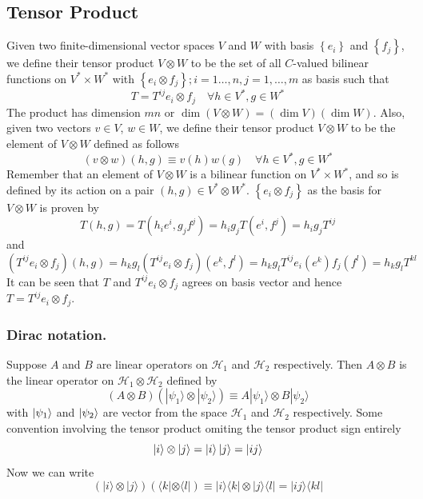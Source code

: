 \documentclass[../../../main.tex]{subfiles}
\begin{document}
\subsection{Tensor Product}
Given two finite-dimensional vector spaces $V$ and $W$ with basis $\left\{ e_i \right\} $ and $\left\{ f_j \right\} $, we define their tensor product $V \otimes W$ to be the set of all $C$-valued bilinear functions on $V ^* \times W ^*$ with $\left\{ e_i \otimes f_j \right\}; i=1\dots,n,j=1,\dots ,m $ as basis such that
\begin{equation*}
  T=T^{ij} e_i \otimes f_j \quad \forall h \in V^*, g \in W^*
\end{equation*}
The product has dimension $mn$ or $\dim(V \otimes W) = (\dim V)(\dim W)$.
Also, given two vectors $v \in V $, $w \in W$, we define their tensor product $V \otimes W$ to be the element of $V \otimes W$ defined as follows
\begin{equation*}
  (v \otimes w)(h, g) \equiv v(h)w(g) \quad \forall h \in V^*, g \in W^*
\end{equation*}
Remember that an element of $V \otimes W$ is a bilinear function on $V ^* \times  W ^*$, and so is defined by its action on a pair $(h, g) \in V ^* \otimes W ^*$.
$\left\{ e_i \otimes f_j \right\}$ as the basis for $V \otimes W$ is proven by
\begin{equation*}
  T(h, g) =  T(h_i e^i,g_j f^j) = h_i g_j T(e^i, f^j) = h_i g_j T^{ij}
\end{equation*}
and
\begin{equation*}
  (T^{ij} e_i \otimes f_j)(h, g)
  = h_kg_l(T^{ij} e_i \otimes f_j) (e^k, f^l)
  = h_kg_lT^{ij} e_i (e^k) f_j (f^l)
  = h_kg_lT^{kl}
\end{equation*}
It can be seen that $T$ and $T^{ij} e_i \otimes f_j$ agrees on basis vector and hence $T=T^{ij} e_i \otimes f_j$.

\subsubsection{Dirac notation.}
Suppose \( A \) and \( B \) are linear operators on \( \mathcal{H}_1 \) and \( \mathcal{H}_2 \) respectively.
Then \( A \otimes B \) is the linear operator on \( \mathcal{H}_1 \otimes \mathcal{H}_2 \) defined by
\begin{equation*}
  (A \otimes B)(|\psi_1\rangle \otimes |\psi_2\rangle) \equiv A|\psi_1\rangle \otimes B|\psi_2\rangle
\end{equation*}
with $\ket{\psi_1}$ and $\ket{\psi_2}$ are vector from the space $\mathcal{H}_1$ and $\mathcal{H}_2$ respectively.
Some convention involving the tensor product omiting the tensor product sign entirely
\begin{equation*}
  \ket{i}\otimes \ket{j}=\ket{i} \ket{j}= \ket{ij}
\end{equation*}
Now we can write
\begin{equation*}
  \left( |i\rangle \otimes |j\rangle \right) \left( \langle k| \otimes \langle l| \right) \equiv |i\rangle \langle k| \otimes |j\rangle \langle l|=|ij\rangle \langle kl|
\end{equation*}
\end{document}
